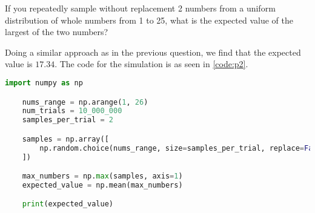 \documentclass{article}
\begin{document}
\begin{question}[title = Question 2]
    If you repeatedly sample without replacement 2 numbers from a uniform
    distribution of whole numbers from 1 to 25, what is the expected value of
    the largest of the two numbers?
\end{question}

Doing a similar approach as in the previous question, we find that the expected value is \textbf{$17.34$}. The code for the simulation is as seen in \autoref{code:p2}.


\begin{lstlisting}[language=Python, caption={Code for simulation}, label={code:p2}]
    import numpy as np

    nums_range = np.arange(1, 26)
    num_trials = 10_000_000
    samples_per_trial = 2 

    samples = np.array([
        np.random.choice(nums_range, size=samples_per_trial, replace=False) for _ in range(num_trials)
    ])

    max_numbers = np.max(samples, axis=1)
    expected_value = np.mean(max_numbers)

    print(expected_value)
\end{lstlisting}


\end{document}
